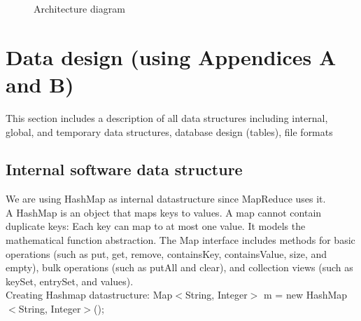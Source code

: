 \documentclass[oneside,a4paper,12pt]{report}
\begin{document}
  \begin{center}
	\begin{figure}[!htbp]
		\centering
	  \caption{Architecture diagram}
	  \label{fig:arch-dig}
	\end{figure}
\end{center} 


\section{Data design (using Appendices A and B)}   
This section includes a description of all data structures including internal, global, and temporary data structures, database design (tables), file formats

\subsection{Internal software data structure}
We are using HashMap as internal datastructure since MapReduce uses it. \\
A HashMap is an object that maps keys to values. A map cannot contain duplicate keys: Each key can map to at most one value. It models the mathematical function abstraction. The Map interface includes methods for basic operations (such as put, get, remove, containsKey, containsValue, size, and empty), bulk operations (such as putAll and clear), and collection views (such as keySet, entrySet, and values). \\
Creating Hashmap datastructure: Map$<$String, Integer$>$ m = new HashMap$<$String, Integer$>$(); \\ \\
     
\end{document}
